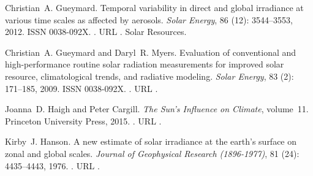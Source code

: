 \documentclass[letterpaper,12pt, twoside]{report}
\providecommand{\DIFdeltex}[1]{{\protect\color{red} \scriptsize #1}} %
\providecommand{\DIFdel}[1]{\texorpdfstring{\DIFdeltex{#1}}{}} %
\begin{document}
\DIFdel{Christian~A. Gueymard.
}%
\DIFdel{Temporal variability in direct and global irradiance at various time
  scales as affected by aerosols.
}%
\DIFdel{\emph{Solar Energy}, 86}%
\DIFdel{(12):}%
\DIFdel{3544--3553, 2012.
}%
\DIFdel{ISSN 0038-092X.
}%
\DIFdel{.
}%
\DIFdel{URL
  }%
\DIFdel{.
}%
\DIFdel{Solar Resources.
}%

\DIFdel{Christian~A. Gueymard and Daryl~R. Myers.
}%
\DIFdel{Evaluation of conventional and high-performance routine solar
  radiation measurements for improved solar resource, climatological trends,
  and radiative modeling.
}%
\DIFdel{\emph{Solar Energy}, 83}%
\DIFdel{(2):}%
\DIFdel{171--185, 2009.
}%
\DIFdel{ISSN 0038-092X.
}%
\DIFdel{.
}%
\DIFdel{URL
  }%
\DIFdel{.
}%

\DIFdel{Joanna~D. Haigh and Peter Cargill.
}%
\DIFdel{\emph{The Sun's Influence on Climate}, volume~11.
}%
\DIFdel{Princeton University Press, 2015.
}%
\DIFdel{.
}%
\DIFdel{URL }%
\DIFdel{.
}%

\DIFdel{Kirby~J. Hanson.
}%
\DIFdel{A new estimate of solar irradiance at the earth's surface on zonal
  and global scales.
}%
\DIFdel{\emph{Journal of Geophysical Research (1896-1977)}, 81}%
\DIFdel{(24):}%
\DIFdel{4435--4443, 1976.
}%
\DIFdel{.
}%
\DIFdel{URL
  }%
\DIFdel{.
}%
\end{document}
